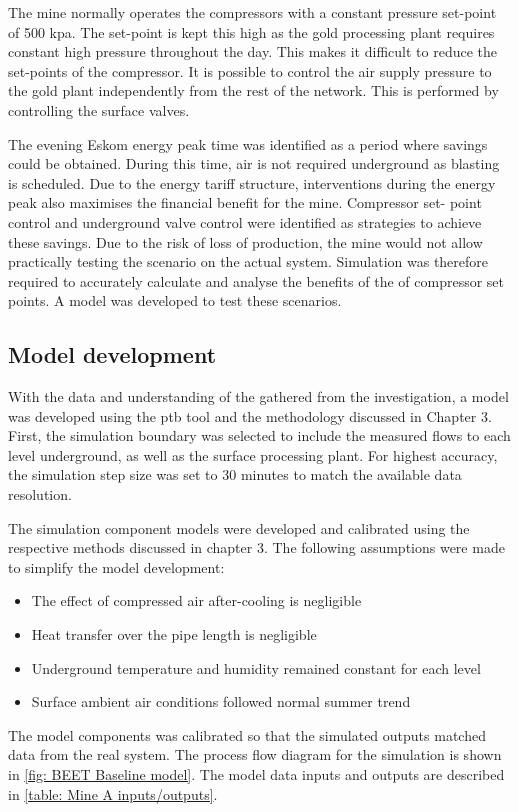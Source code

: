  \par 
 The mine normally operates the compressors with a constant pressure set-point of 500 \gls{kpa}. The set-point is kept this high as the gold processing plant requires constant high pressure throughout the day. This makes it difficult to reduce the set-points of the compressor. It is possible to control the air supply pressure to the gold plant independently from the rest of the network. This is performed by controlling the surface valves.
 \par 
  The evening Eskom energy peak time was identified as a period where savings could be obtained. During this time, air is not required underground as blasting is scheduled. Due to the energy tariff structure, interventions during the energy peak also maximises the financial benefit for the mine. Compressor set- point control and underground valve control were identified as strategies to achieve these savings. Due to the risk of loss of production, the mine would not allow practically testing the scenario on the actual system. Simulation was therefore required to accurately calculate and analyse the benefits of the of compressor set points. A model was developed to test these scenarios.

\subsection{Model development}
With the data and understanding of the gathered from the investigation, a model was developed using the \gls{ptb} tool and the methodology discussed in Chapter 3. First, the simulation boundary was selected to include the measured flows to each level underground, as well as the surface processing plant. For highest accuracy, the simulation step size was set to 30 minutes to match the available data resolution.
\par
The simulation component models were developed and calibrated using the respective methods discussed in chapter 3. The following assumptions were made to simplify the model development:
\begin{itemize}
	\item The effect of compressed air after-cooling is negligible
	\item Heat transfer over the pipe length is negligible
	\item Underground temperature and humidity remained constant for each level
	\item Surface ambient air conditions followed normal summer trend
\end{itemize} 
The model components was calibrated so that the simulated outputs matched data from the real system. The process flow diagram for the simulation is shown in \cref{fig: BEET Baseline model}. The model data inputs and outputs are described in \cref{table: Mine A inputs/outputs}.

